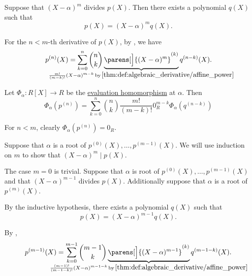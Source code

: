 \begin{defproof}
   Suppose that \( (X - \alpha)^m \) divides \( p(X) \). Then there exists a polynomial \( q(X) \) such that
  \begin{equation*}
    p(X) = (X - \alpha)^m q(X).
  \end{equation*}

  For the \( n < m \)-th derivative of \( p(X) \), by , we have
  \begin{equation*}
    p^{(n)}(X) = \sum_{k=0}^n \binom n k \underbrace{\parens[\Big]{ (X - \alpha)^m }^{(k)}}_{\mathclap{\frac {m!} {(m-k)!} (X - \alpha)^{m-k} \T*{by} \ref{thm:def:algebraic_derivative/affine_power}}} q^{(n-k)}(X).
  \end{equation*}

  Let \( \Phi_\alpha: R[X] \to R \) be the \hyperref[con:evaluation_homomorphism]{evaluation homomorphism} at \( \alpha \). Then
  \begin{equation*}
    \Phi_\alpha(p^{(n)}) = \sum_{k=0}^n \binom n k \frac {m!} {(m-k)!} 0_R^{m-k} \Phi_\alpha(q^{(n-k)})
  \end{equation*}

  For \( n < m \), clearly \( \Phi_\alpha(p^{(n)}) = 0_R \).

   Suppose that \( \alpha \) is a root of \( p^{(0)}(X), \ldots, p^{(m-1)}(X) \). We will use induction on \( m \) to show that \( (X - \alpha)^m \mid p(X) \).

  The case \( m = 0 \) is trivial. Suppose that \( \alpha \) is root of \( p^{(0)}(X), \ldots, p^{(m-1)}(X) \) and that \( (X - \alpha)^{m-1} \) divides \( p(X) \). Additionally suppose that \( \alpha \) is a root of \( p^{(m)}(X) \).

  By the inductive hypothesis, there exists a polynomial \( q(X) \) such that
  \begin{equation*}
    p(X) = (X - \alpha)^{m-1} q(X).
  \end{equation*}

  By ,
  \begin{equation*}
    p^{(m-1)}(X) = \sum_{k=0}^{m-1} \binom {m-1} k \underbrace{\parens[\Big]{ (X - \alpha)^{m - 1} }^{(k)}}_{\mathclap{\frac {(m - 1)!} {(m - 1 - k)!} (X - \alpha)^{m - 1 - k} \T*{by} \ref{thm:def:algebraic_derivative/affine_power}}} q^{(m - 1 - k)}(X).
  \end{equation*}


\end{defproof}
